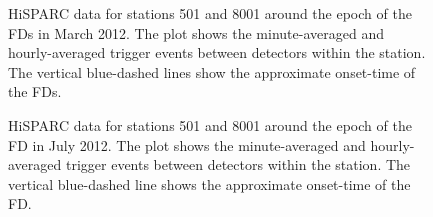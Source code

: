 \begin{figure}[ht]
	\centering
	
	\caption{HiSPARC data for stations 501 and 8001 around the epoch of the FDs in March 2012. The plot shows the minute-averaged and hourly-averaged trigger events between detectors within the station. The vertical blue-dashed lines show the approximate onset-time of the FDs.}
	\label{fig:FD_201203}
\end{figure}

\begin{figure}[ht]
	\centering
	
	\caption{HiSPARC data for stations 501 and 8001 around the epoch of the FD in July 2012. The plot shows the minute-averaged and hourly-averaged trigger events between detectors within the station. The vertical blue-dashed line shows the approximate onset-time of the FD.}
	\label{fig:FD_201207}
\end{figure}

